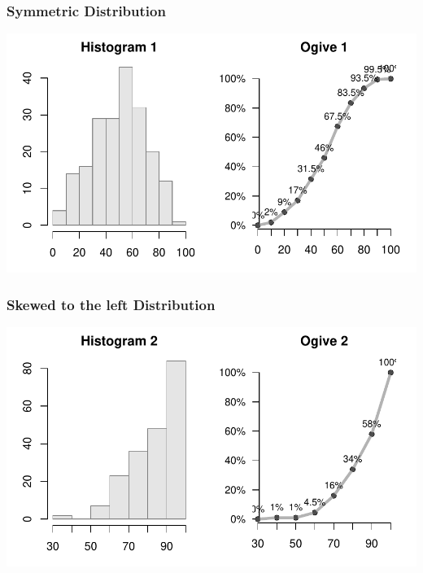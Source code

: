 \documentclass[12pt]{beamer}\usepackage[]{graphicx}\usepackage[]{color}
\newenvironment{knitrout}{}{} %
\begin{document}

\begin{frame}[fragile]
\frametitle{Symmetric Distribution}


\begin{knitrout}\footnotesize
{}\color{fgcolor}

{\centering \includegraphics[width=.9\linewidth,height=.5\linewidth]{figure/unnamed-chunk-30-1} 

}



\end{knitrout}

\end{frame}


\begin{frame}[fragile]
\frametitle{Skewed to the left Distribution}

\begin{knitrout}\footnotesize
{}\color{fgcolor}

{\centering \includegraphics[width=.9\linewidth,height=.5\linewidth]{figure/unnamed-chunk-31-1} 

}



\end{knitrout}

\end{frame}
\end{document}
